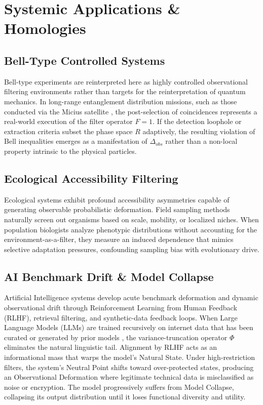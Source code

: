 \documentclass[11pt,twocolumn]{article}
\begin{document}
\section{Systemic Applications \& Homologies}

\subsection{Bell-Type Controlled Systems}
Bell-type experiments are reinterpreted here as highly controlled observational filtering environments rather than targets for the reinterpretation of quantum mechanics. In long-range entanglement distribution missions, such as those conducted via the Micius satellite \cite{yin2017satellite}, the post-selection of coincidences represents a real-world execution of the filter operator $F=1$. If the detection loophole or extraction criteria subset the phase space $R$ adaptively, the resulting violation of Bell inequalities emerges as a manifestation of $\Delta_{obs}$ rather than a non-local property intrinsic to the physical particles.

\subsection{Ecological Accessibility Filtering}
Ecological systems exhibit profound accessibility asymmetries capable of generating observable probabilistic deformation. Field sampling methods naturally screen out organisms based on scale, mobility, or localized niches. When population biologists analyze phenotypic distributions without accounting for the environment-as-a-filter, they measure an induced dependence that mimics selective adaptation pressures, confounding sampling bias with evolutionary drive.

\subsection{AI Benchmark Drift \& Model Collapse}
Artificial Intelligence systems develop acute benchmark deformation and dynamic observational drift through Reinforcement Learning from Human Feedback (RLHF), retrieval filtering, and synthetic-data feedback loops. When Large Language Models (LLMs) are trained recursively on internet data that has been curated or generated by prior models \cite{shumailov2024model}, the variance-truncation operator $\Phi$ eliminates the natural linguistic tail. Alignment by RLHF acts as an informational mass that warps the model's Natural State. Under high-restriction filters, the system's Neutral Point shifts toward over-protected states, producing an Observational Deformation where legitimate technical data is misclassified as noise or encryption. The model progressively suffers from Model Collapse, collapsing its output distribution until it loses functional diversity and utility.
\end{document}
